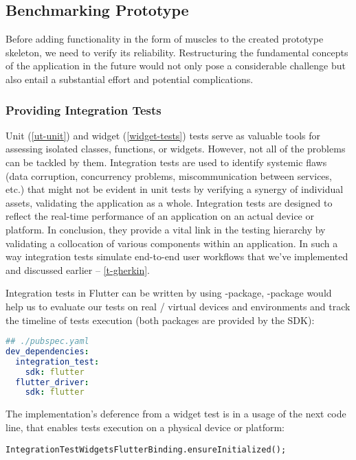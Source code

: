 
\subsection{Benchmarking Prototype}

Before adding functionality in the form of muscles to the created prototype skeleton, we need to verify its reliability.
Restructuring the fundamental concepts of the application in the future would not only pose a considerable challenge 
but also entail a substantial effort and potential complications.


\subsubsection{Providing Integration Tests}

Unit (\ref{ut-unit}) and widget (\ref{widget-tests}) tests serve as valuable tools for assessing isolated classes, 
functions, or widgets. However, not all of the problems can be tackled by them. Integration tests are used to identify 
systemic flaws (data corruption, concurrency problems, miscommunication between services, etc.) that might not be 
evident in unit tests by verifying a synergy of individual assets, validating the application as a whole. 
Integration tests are designed to reflect the real-time performance of an application on an actual device or platform. 
In conclusion, they provide a vital link in the testing hierarchy by validating a collocation of various components 
within an application. In such a way integration tests simulate end-to-end user workflows that we've implemented and 
discussed earlier -- \ref{t-gherkin}.

Integration tests in Flutter can be written by using -package, -package would 
help us to evaluate our tests on real / virtual devices and environments and track the timeline of tests execution 
(both packages are provided by the SDK):

\begin{lstlisting}[language=yaml]
## ./pubspec.yaml
dev_dependencies:
  integration_test:
    sdk: flutter
  flutter_driver: 
    sdk: flutter
\end{lstlisting}

\noindent The implementation's deference from a widget test is in a usage of the next code line, that enables tests 
execution on a physical device or platform:
\begin{lstlisting}
IntegrationTestWidgetsFlutterBinding.ensureInitialized();
\end{lstlisting}

